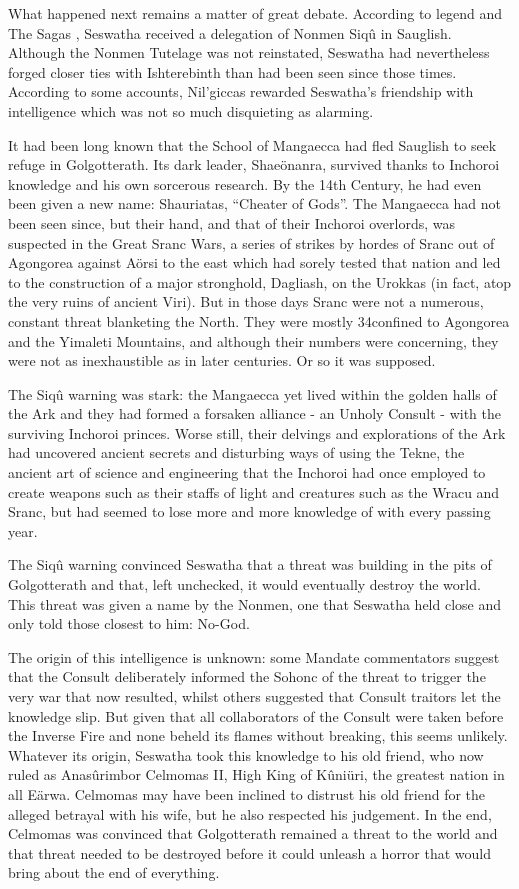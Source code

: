 \documentclass[]{book}
\begin{document}
What happened next remains a matter of great debate. According to legend and The
Sagas , Seswatha received a delegation of Nonmen Siqû in Sauglish. Although the
Nonmen Tutelage was not reinstated, Seswatha had nevertheless forged closer ties with
Ishterebinth than had been seen since those times. According to some accounts,
Nil'giccas rewarded Seswatha's friendship with intelligence which was not so much
disquieting as alarming.

It had been long known that the School of Mangaecca had fled Sauglish to seek refuge
in Golgotterath. Its dark leader, Shaeönanra, survived thanks to Inchoroi knowledge
and his own sorcerous research. By the 14th Century, he had even been given a new
name: Shauriatas, ``Cheater of Gods''. The Mangaecca had not been seen since, but
their hand, and that of their Inchoroi overlords, was suspected in the Great Sranc
Wars, a series of strikes by hordes of Sranc out of Agongorea against Aörsi to the east
which had sorely tested that nation and led to the construction of a major stronghold,
Dagliash, on the Urokkas (in fact, atop the very ruins of ancient Viri). But in those days
Sranc were not a numerous, constant threat blanketing the North. They were mostly
34confined to Agongorea and the Yimaleti Mountains, and although their numbers were
concerning, they were not as inexhaustible as in later centuries. Or so it was supposed.

The Siqû warning was stark: the Mangaecca yet lived within the golden halls of the Ark
and they had formed a forsaken alliance - an Unholy Consult - with the surviving
Inchoroi princes. Worse still, their delvings and explorations of the Ark had uncovered
ancient secrets and disturbing ways of using the Tekne, the ancient art of science and
engineering that the Inchoroi had once employed to create weapons such as their staffs
of light and creatures such as the Wracu and Sranc, but had seemed to lose more and
more knowledge of with every passing year.

The Siqû warning convinced Seswatha that a threat was building in the pits of
Golgotterath and that, left unchecked, it would eventually destroy the world. This
threat was given a name by the Nonmen, one that Seswatha held close and only told
those closest to him: No-God.

The origin of this intelligence is unknown: some Mandate commentators suggest that
the Consult deliberately informed the Sohonc of the threat to trigger the very war that
now resulted, whilst others suggested that Consult traitors let the knowledge slip. But
given that all collaborators of the Consult were taken before the Inverse Fire and none
beheld its flames without breaking, this seems unlikely.
Whatever its origin, Seswatha took this knowledge to his old friend, who now ruled as
Anasûrimbor Celmomas II, High King of Kûniüri, the greatest nation in all Eärwa.
Celmomas may have been inclined to distrust his old friend for the alleged betrayal
with his wife, but he also respected his judgement. In the end, Celmomas was
convinced that Golgotterath remained a threat to the world and that threat needed to
be destroyed before it could unleash a horror that would bring about the end of
everything.
\end{document}

